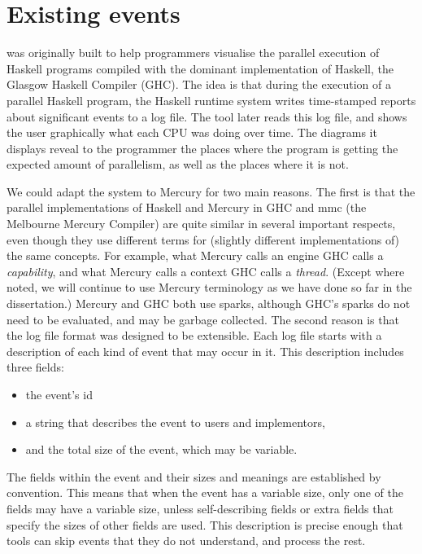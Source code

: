
\section{Existing \tscope events}
\label{sec:tscope_background}

\tscope was originally built
to help programmers visualise the parallel execution of Haskell programs
compiled with the dominant implementation of Haskell,
the Glasgow Haskell Compiler (GHC).
The idea is that during the execution of a parallel Haskell program,
the Haskell runtime system writes time-stamped reports
about significant events to a log file.
The \tscope tool later reads this log file,
and shows the user graphically what each CPU was doing over time.
The diagrams it displays reveal to the programmer
the places where the program is getting the expected amount of parallelism,
as well as the places where it is not.

We could adapt the \tscope system to Mercury for two main reasons.
The first is that the parallel implementations of Haskell and Mercury
in GHC and mmc (the Melbourne Mercury Compiler)
are quite similar in several important respects,
even though they use different terms for
(slightly different implementations of) the same concepts.
For example, what Mercury calls an engine GHC calls a \emph{capability},
and what Mercury calls a context GHC calls a \emph{thread}.
(Except where noted,
we will continue to use Mercury terminology as we have done so far in the
dissertation.)
Mercury and GHC both use sparks,
although GHC's sparks do not need to be evaluated,
and may be garbage collected.
The second reason is that
the \tscope log file format was designed to be extensible.
Each log file starts with a description
of each kind of event that may occur in it.
This description includes three fields:
\begin{itemize}
\item the event's id
\item a string that describes the event to users and implementors,
\item and the total size of the event,
which may be variable.
\end{itemize}
The fields within the event and their sizes and meanings are established by
convention.
This means that when the event has a variable size,
only one of the fields may have a variable size,
unless self-describing fields or extra fields that specify the sizes of
other fields are used.
This description is precise enough that tools
can skip events that they do not understand,
and process the rest.

